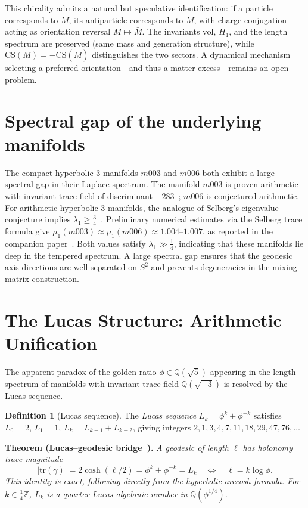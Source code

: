 ﻿\documentclass[12pt]{article}
\theoremstyle{definition}
\newtheorem{definition}[theorem]{Definition}
\begin{document}
This chirality admits a natural but speculative identification: if a
particle corresponds to $M$, its antiparticle corresponds to $\bar{M}$,
with charge conjugation acting as orientation reversal
$M\mapsto\bar{M}$. The invariants $\mathrm{vol}$, $H_1$, and the
length spectrum are preserved (same mass and generation structure),
while $\mathrm{CS}(M) = -\mathrm{CS}(\bar{M})$ distinguishes the two
sectors. A dynamical mechanism selecting a preferred orientation---and
thus a matter excess---remains an open problem.

\section{Spectral gap of the underlying manifolds}
\label{sec:spectral}

The compact hyperbolic 3-manifolds $m003$ and $m006$ both exhibit a
large spectral gap in their Laplace spectrum.
The manifold $m003$ is proven arithmetic with invariant trace field
of discriminant $-283$~\cite{Chinburg98}; $m006$ is conjectured arithmetic.
For arithmetic hyperbolic 3-manifolds, the analogue of Selberg's
eigenvalue conjecture implies $\lambda_1 \geq \tfrac{3}{4}$~\cite{Sarnak}.
Preliminary numerical estimates via the Selberg trace formula give
$\mu_1(m003) \approx \mu_1(m006) \approx 1.004$--$1.007$,
as reported in the companion paper~\cite{Gentry:Twist}.
Both values satisfy $\lambda_1 \gg \tfrac{1}{4}$, indicating that
these manifolds lie deep in the tempered spectrum.
A large spectral gap ensures that the geodesic axis directions are
well-separated on $S^2$ and prevents degeneracies in the mixing
matrix construction.


\section{The Lucas Structure: Arithmetic Unification}
\label{sec:lucas}

The apparent paradox of the golden ratio $\phi \in \mathbb{Q}(\sqrt{5})$
appearing in the length spectrum of manifolds with invariant trace field
$\mathbb{Q}(\sqrt{-3})$ is resolved by the Lucas sequence.

\begin{definition}[Lucas sequence]
The \emph{Lucas sequence} $L_k = \phi^k + \phi^{-k}$ satisfies
$L_0=2$, $L_1=1$, $L_k = L_{k-1}+L_{k-2}$, giving integers
$2,1,3,4,7,11,18,29,47,76,\ldots$
\end{definition}

\noindent\textbf{Theorem (Lucas--geodesic bridge~\cite{Gentry:Lucas}).}
\emph{A geodesic of length $\ell$ has holonomy trace magnitude}
\begin{equation}
  |\mathrm{tr}(\gamma)| = 2\cosh(\ell/2)
  = \phi^k + \phi^{-k} = L_k
  \quad\Longleftrightarrow\quad \ell = k\log\phi.
  \label{eq:lucas-bridge}
\end{equation}
\emph{This identity is exact, following directly from the hyperbolic
arccosh formula. For $k\in\tfrac{1}{4}\mathbb{Z}$, $L_k$ is a
quarter-Lucas algebraic number in $\mathbb{Q}(\phi^{1/4})$.}
\end{document}
